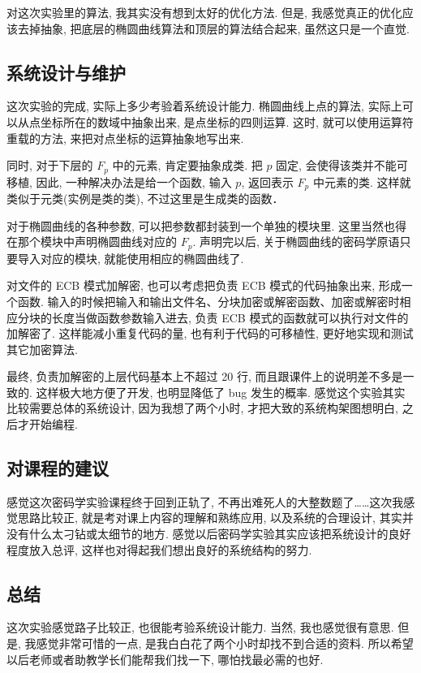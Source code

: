 \documentclass[12pt,a4paper]{article}
\begin{document}
对这次实验里的算法, 我其实没有想到太好的优化方法. 但是, 我感觉真正的优化应该去掉抽象, 把底层的椭圆曲线算法和顶层的算法结合起来, 虽然这只是一个直觉. 

\subsection*{系统设计与维护}

这次实验的完成, 实际上多少考验着系统设计能力. 椭圆曲线上点的算法, 实际上可以从点坐标所在的数域中抽象出来, 是点坐标的四则运算. 这时, 就可以使用运算符重载的方法, 来把对点坐标的运算抽象地写出来. 

同时, 对于下层的 $ F_p $ 中的元素, 肯定要抽象成类. 把 $ p $ 固定, 会使得该类并不能可移植, 因此, 一种解决办法是给一个函数, 输入 $ p $, 返回表示 $ F_p $ 中元素的类. 这样就类似于元类(实例是类的类), 不过这里是生成类的函数．　

对于椭圆曲线的各种参数, 可以把参数都封装到一个单独的模块里. 这里当然也得在那个模块中声明椭圆曲线对应的 $ F_p $. 声明完以后, 关于椭圆曲线的密码学原语只要导入对应的模块, 就能使用相应的椭圆曲线了. 

对文件的 ECB 模式加解密, 也可以考虑把负责 ECB 模式的代码抽象出来, 形成一个函数. 输入的时候把输入和输出文件名、分块加密或解密函数、加密或解密时相应分块的长度当做函数参数输入进去, 负责 ECB 模式的函数就可以执行对文件的加解密了. 这样能减小重复代码的量, 也有利于代码的可移植性, 更好地实现和测试其它加密算法. 

最终, 负责加解密的上层代码基本上不超过 20 行, 而且跟课件上的说明差不多是一致的. 这样极大地方便了开发, 也明显降低了 bug 发生的概率. 感觉这个实验其实比较需要总体的系统设计, 因为我想了两个小时, 才把大致的系统构架图想明白, 之后才开始编程. 

\subsection*{对课程的建议}

感觉这次密码学实验课程终于回到正轨了, 不再出难死人的大整数题了……这次我感觉思路比较正, 就是考对课上内容的理解和熟练应用, 以及系统的合理设计, 其实并没有什么太刁钻或太细节的地方. 感觉以后密码学实验其实应该把系统设计的良好程度放入总评, 这样也对得起我们想出良好的系统结构的努力. 

\subsection*{总结}

这次实验感觉路子比较正, 也很能考验系统设计能力. 当然, 我也感觉很有意思. 但是, 我感觉非常可惜的一点, 是我白白花了两个小时却找不到合适的资料. 所以希望以后老师或者助教学长们能帮我们找一下, 哪怕找最必需的也好. 
\end{document}
